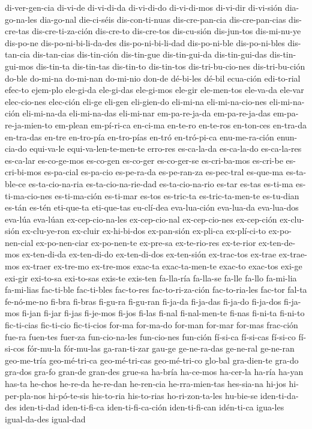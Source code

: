 {di-ver-gen-cia di-vi-de di-vi-di-da di-vi-di-do di-vi-di-mos di-vi-dir di-vi-sión dia-go-na-les
dia-go-nal die-ci-séis dis-con-ti-nuas dis-cre-pan-cia dis-cre-pan-cias dis-cre-tas
dis-cre-ti-za-ción dis-cre-to dis-cre-tos dis-cu-sión dis-jun-tos dis-mi-nu-ye dis-po-ne
dis-po-ni-bi-li-da-des dis-po-ni-bi-li-dad dis-po-ni-ble dis-po-ni-bles dis-tan-cia dis-tan-cias
dis-tin-ción dis-tin-gue dis-tin-gui-da dis-tin-gui-das dis-tin-gui-mos dis-tin-ta dis-tin-tas
dis-tin-to dis-tin-tos dis-tri-bu-cio-nes dis-tri-bu-ción do-ble do-mi-na do-mi-nan do-mi-nio don-de
dé-bi-les dé-bil ecua-ción edi-to-rial efec-to ejem-plo ele-gi-da ele-gi-das ele-gi-mos ele-gir
ele-men-tos ele-va-da ele-var elec-cio-nes elec-ción eli-ge eli-gen eli-gien-do eli-mi-na
eli-mi-na-cio-nes eli-mi-na-ción eli-mi-na-da eli-mi-na-das eli-mi-nar em-pa-re-ja-da
em-pa-re-ja-das em-pa-re-ja-mien-to em-plean em-pí-ri-ca en-ci-ma en-te-ro en-te-ros en-ton-ces
en-tra-da en-tra-das en-tre en-tro-pía en-tro-pías en-tró en-tró-pi-ca enu-me-ra-ción enun-cia-do
equi-va-le equi-va-len-te-men-te erro-res es-ca-la-da es-ca-la-do es-ca-la-res es-ca-lar
es-co-ge-mos es-co-gen es-co-ger es-co-ger-se es-cri-ba-mos es-cri-be es-cri-bi-mos es-pa-cial
es-pa-cio es-pe-ra-da es-pe-ran-za es-pec-tral es-que-ma es-ta-ble-ce es-ta-cio-na-ria
es-ta-cio-na-rie-dad es-ta-cio-na-rio es-tar es-tas es-ti-ma es-ti-ma-cio-nes es-ti-ma-ción
es-ti-mar es-tos es-tric-ta es-tric-ta-men-te es-tu-dian es-tán es-tén eti-que-ta eti-que-tas
eu-clí-dea eva-lua-ción eva-lua-da eva-lua-dos eva-lúa eva-lúan ex-cep-cio-na-les ex-cep-cio-nal
ex-cep-cio-nes ex-cep-ción ex-clu-sión ex-clu-ye-ron ex-cluir ex-hi-bi-dos ex-pan-sión ex-pli-ca
ex-plí-ci-to ex-po-nen-cial ex-po-nen-ciar ex-po-nen-te ex-pre-sa ex-te-rio-res ex-te-rior
ex-ten-de-mos ex-ten-di-da ex-ten-di-do ex-ten-di-dos ex-ten-sión ex-trac-tos ex-trae ex-trae-mos
ex-traer ex-tre-mo ex-tre-mos exac-ta exac-ta-men-te exac-to exac-tos exi-ge exi-gir exi-to-sa
exi-to-sas exis-te exis-ten fa-lla-ría fa-lla-se fa-lle fa-llo fa-mi-lia fa-mi-lias fac-ti-ble
fac-ti-bles fac-to-res fac-to-ri-za-ción fac-to-ria-les fac-tor fal-ta fe-nó-me-no fi-bra fi-bras
fi-gu-ra fi-gu-ran fi-ja-da fi-ja-das fi-ja-do fi-ja-dos fi-ja-mos fi-jan fi-jar fi-jas fi-je-mos
fi-jos fi-las fi-nal fi-nal-men-te fi-nas fi-ni-ta fi-ni-to fic-ti-cias fic-ti-cio fic-ti-cios
for-ma for-ma-do for-man for-mar for-mas frac-ción fue-ra fuen-tes fuer-za fun-cio-na-les
fun-cio-nes fun-ción fí-si-ca fí-si-cas fí-si-co fí-si-cos fór-mu-la fór-mu-las ga-ran-ti-zar gau-ge
ge-ne-ra-das ge-ne-ral ge-ne-ran geo-me-tría geo-mé-tri-ca geo-mé-tri-cas geo-mé-tri-co glo-bal
gra-dien-te gra-do gra-dos gra-fo gran-de gran-des grue-sa ha-bría ha-ce-mos ha-cer-la ha-ría ha-yan
has-ta he-chos he-re-da he-re-dan he-ren-cia he-rra-mien-tas hes-sia-na hi-jos hi-per-pla-nos
hi-pó-te-sis his-to-ria his-to-rias ho-ri-zon-ta-les hu-bie-se iden-ti-da-des iden-ti-dad
iden-ti-fi-ca iden-ti-fi-ca-ción iden-ti-fi-can idén-ti-ca igua-les igual-da-des igual-dad
}
